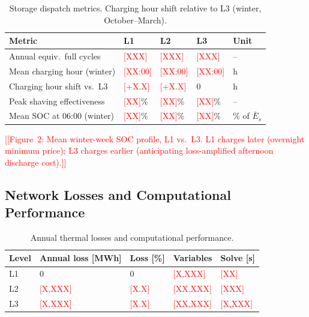 \documentclass[review,3p]{elsarticle}
\newcommand{\placeholder}[1]{\textcolor{red}{[#1]}}
\begin{document}
\begin{table}[htbp]
\centering
\caption{Storage dispatch metrics. Charging hour shift relative to
L3 (winter, October--March).}
\label{tab:storage}
\begin{tabular}{@{}lllll@{}}
\toprule
Metric & L1 & L2 & L3 & Unit \\
\midrule
Annual equiv.\ full cycles
  & \placeholder{XXX} & \placeholder{XXX}
  & \placeholder{XXX} & -- \\
Mean charging hour (winter)
  & \placeholder{XX:00} & \placeholder{XX:00}
  & \placeholder{XX:00} & h \\
Charging hour shift vs.\ L3
  & \placeholder{+X.X} & \placeholder{+X.X} & 0 & h \\
Peak shaving effectiveness
  & \placeholder{XX}\% & \placeholder{XX}\%
  & \placeholder{XX}\% & -- \\
Mean SOC at 06:00 (winter)
  & \placeholder{XX}\% & \placeholder{XX}\%
  & \placeholder{XX}\% & \% of $\bar{E}_s$ \\
\bottomrule
\end{tabular}
\end{table}

\placeholder{[Figure~2: Mean winter-week SOC profile, L1 vs.\ L3.
L1 charges later (overnight minimum price); L3 charges earlier
(anticipating loss-amplified afternoon discharge cost).]}

\subsection{Network Losses and Computational Performance}
\label{sec:results_computation}

\begin{table}[htbp]
\centering
\caption{Annual thermal losses and computational performance.}
\label{tab:losses_computation}
\begin{tabular}{@{}lllll@{}}
\toprule
Level & Annual loss [MWh] & Loss [\%] & Variables & Solve [s] \\
\midrule
L1 & 0 & 0 & \placeholder{X,XXX} & \placeholder{XX} \\
L2 & \placeholder{X,XXX} & \placeholder{X.X}
  & \placeholder{XX,XXX} & \placeholder{XXX} \\
L3 & \placeholder{X,XXX} & \placeholder{X.X}
  & \placeholder{XX,XXX} & \placeholder{X,XXX} \\
\bottomrule
\end{tabular}
\end{table}
\end{document}
